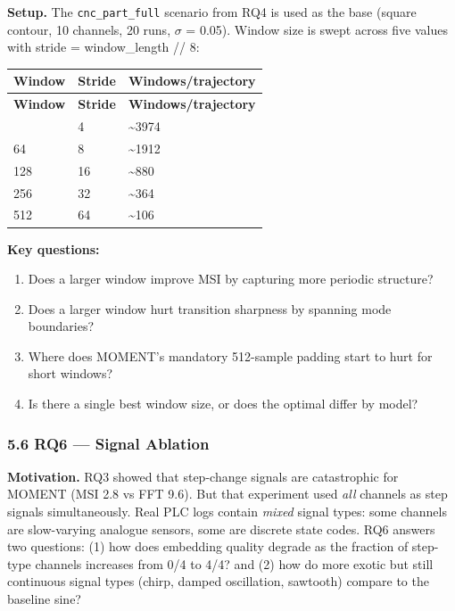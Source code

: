 \documentclass[11pt,a4paper]{article}
\begin{document}
\textbf{Setup.} The \texttt{cnc\_part\_full} scenario from RQ4 is used as the base (square contour, 10 channels,
20 runs, $\sigma$ = 0.05). Window size is swept across five values with stride = window\_length // 8:

\begin{longtable}{|l|l|l|}
\hline
\textbf{Window} & \textbf{Stride} & \textbf{Windows/trajectory} \\
\hline
\endfirsthead
\hline
\textbf{Window} & \textbf{Stride} & \textbf{Windows/trajectory} \\
\hline
\endhead
\hline
\endfoot
32 & 4 & \textasciitilde{}3974 \\
\hline
64 & 8 & \textasciitilde{}1912 \\
\hline
128 & 16 & \textasciitilde{}880 \\
\hline
256 & 32 & \textasciitilde{}364 \\
\hline
512 & 64 & \textasciitilde{}106 \\
\hline
\end{longtable}

\textbf{Key questions:}
\begin{enumerate}
  \item Does a larger window improve MSI by capturing more periodic structure?
  \item Does a larger window hurt transition sharpness by spanning mode boundaries?
  \item Where does MOMENT's mandatory 512-sample padding start to hurt for short windows?
  \item Is there a single best window size, or does the optimal differ by model?
\end{enumerate}

\subsubsection{5.6 RQ6 --- Signal Ablation}

\textbf{Motivation.} RQ3 showed that step-change signals are catastrophic for MOMENT (MSI 2.8 vs
FFT 9.6). But that experiment used \textit{all} channels as step signals simultaneously. Real PLC logs
contain \textit{mixed} signal types: some channels are slow-varying analogue sensors, some are discrete
state codes. RQ6 answers two questions: (1) how does embedding quality degrade as the fraction
of step-type channels increases from 0/4 to 4/4? and (2) how do more exotic but still continuous
signal types (chirp, damped oscillation, sawtooth) compare to the baseline sine?
\end{document}
